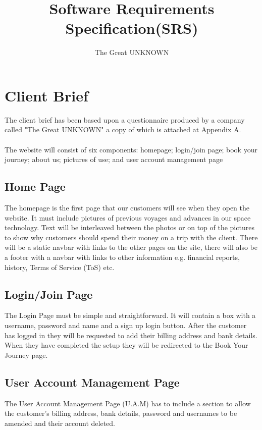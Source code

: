 \documentclass{article}
\title{Software Requirements Specification(SRS)}
\author{The Great UNKNOWN}
\begin{document}
\maketitle

\tableofcontents

\pagebreak


\section{Client Brief}

The client brief has been based upon a questionnaire produced by a company called "The Great UNKNOWN"  a copy of which is attached at Appendix A.
\\
\\
The website will consist of six components:  homepage; login/join page; book your journey; about us; pictures of use; and user account management page

\subsection{Home Page}
The homepage is the first page that our customers will see when they open the website. It must include pictures of previous voyages and advances in our space technology. Text will be interleaved between the photos or on top of the pictures to show why customers should spend their money on a trip with the client. There will be a static navbar with links to the other pages on the site, there will also be a footer with a navbar with links to other information e.g. financial reports, history, Terms of Service (ToS) etc.

\subsection{Login/Join Page}
The Login Page must be simple and straightforward. It will contain a box with a username, password and name and a sign up login button. After the customer has logged in they will be requested to add their billing address and bank details. When they have completed the setup they will be redirected to the Book Your Journey page.

\subsection{User Account Management Page}
The User Account Management Page (U.A.M) has to include a section to allow the customer's billing address, bank details, password and usernames to be amended and their account deleted. 
\end{document}

